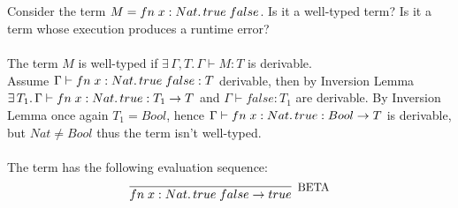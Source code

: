 \subsection{}

Consider the term $M = fn\;x: Nat.\,true\;false$. Is it a well-typed
term? Is it a term whose execution produces a runtime error?\\~\\
The term $M$ is well-typed if $\exists\, \Gamma, T.\, \Gamma \vdash M: T$ is
derivable.\\
Assume $\Gamma \vdash fn\;x: Nat.\,true\;false:T$ derivable, then by
Inversion Lemma $\exists\, T_1.\, \Gamma \vdash fn\;x: Nat.\,true : T_1 \to T$
and $\Gamma \vdash false : T_1$ are derivable. By Inversion Lemma once again
$T_1 = Bool$, hence $\Gamma \vdash fn\;x: Nat.\,true : Bool \to T$ is
derivable, but $Nat \ne Bool$ thus the term isn't well-typed.\\~\\
The term has the following evaluation sequence:
\begin{align*}
	\infer[\text{\small{BETA}}]{ \APP{\FN{x: Nat}{true}}{false} \to true}{}
\end{align*}
